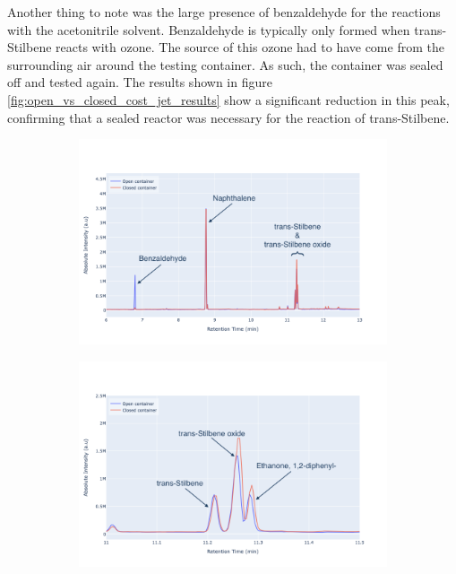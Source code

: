 Another thing to note was the large presence of benzaldehyde for the reactions with the acetonitrile solvent. Benzaldehyde is typically only formed when trans-Stilbene reacts with ozone. The source of this ozone had to have come from the surrounding air around the testing container. As such, the container was sealed off and tested again. The results shown in figure \ref{fig:open_vs_closed_cost_jet_results} show a significant reduction in this peak, confirming that a sealed reactor was necessary for the reaction of trans-Stilbene.

\begin{figure}
    \centering
    \begin{subfigure}[b]{\textwidth}
        \centering
        \includegraphics[width=\textwidth]{chapter_6/figures/open_vs_closed_cost_jet.png}
        \caption{}
        \label{fig:open_vs_closed_cost_jet}
    \end{subfigure}
    \hfill
    \begin{subfigure}[b]{\textwidth}  
        \centering 
        \includegraphics[width=\textwidth]{chapter_6/figures/open_vs_closed_cost_jet_close_up.png}
        \caption{}
        \label{fig:open_vs_closed_cost_jet_close_up}
    \end{subfigure}


\end{figure}
